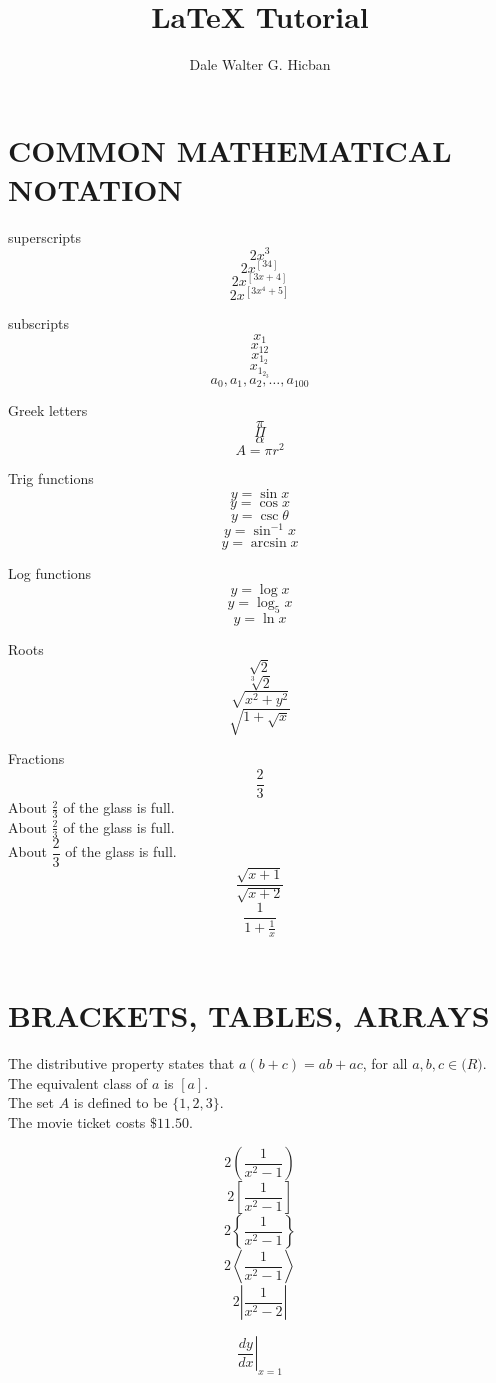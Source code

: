 \documentclass{article}
\title{LaTeX Tutorial}
\author{Dale Walter G. Hicban}
\begin{document}
\maketitle

\break

\section{COMMON MATHEMATICAL NOTATION}

superscripts $$2x^3$$
$$2x^[34]$$
$$2x^[  3x+4  ]$$
$$2x^[  3x^4+5  ]$$

subscripts
$$x_1$$
$$x_{12}$$
$$x_{1_2}$$
$$x_{  1_{2_3}  }$$
$$a_0, a_1, a_2, \ldots, a_{100}$$

Greek letters
$$\pi$$
$$\Pi$$
$$\alpha$$
$$A=\pi r^2$$

Trig functions
$$y=\sin x$$
$$y=\cos x$$
$$y=\csc \theta$$
$$y=\sin^{-1} x$$
$$y=\arcsin x$$

Log functions
$$y=\log x$$
$$y=\log_5 x$$
$$y=\ln x$$

Roots
$$\sqrt{2}$$
$$\sqrt[3]{2}$$
$$\sqrt{  x^2+y^2  }$$
$$\sqrt{ 1+\sqrt{x} }$$

Fractions
$$\frac{2}{3}$$
About $\frac{2}{3}$ of the glass is full.\\[6pt]
About $\displaystyle \frac{2}{3}$ of the glass is full.\\[6pt]
About $\dfrac{2}{3}$ of the glass is full.\\[6pt]

$$\frac{  \sqrt{x+1}  }{  \sqrt{x+2}  }$$
$$\frac{1}{  1+\frac{1}{x}  }$$\\[12pt]

\section{BRACKETS, TABLES, ARRAYS}
	The distributive property states that $a(b+c)=ab+ac$, for all $a, b, c \in \mathbb(R)$.\\[6pt]
	The equivalent class of $a$ is $[a]$.\\[6pt]
	The set $A$ is defined to be $\{1, 2, 3\}$.\\[6pt]
	The movie ticket costs $\$11.50$.

$$2\left(  \frac{1}{x^2-1}  \right)$$
$$2\left[  \frac{1}{x^2-1}  \right]$$
$$2\left\{  \frac{1}{x^2-1}  \right\}$$
$$2\left \langle \frac{1}{x^2-1}\right \rangle $$
$$2\left | \frac{1}{x^2-2}\right | $$

$$\left.\frac{dy}{dx}\right|_{x=1}$$
\end{document}
